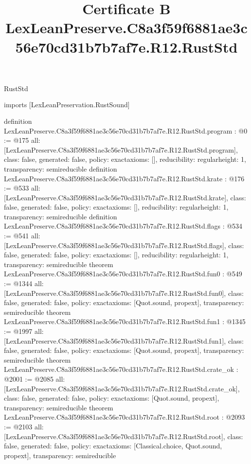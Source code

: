\begin{lexlean}{RustStd}
\title{Certificate B LexLeanPreserve.C8a3f59f6881ae3c56e70cd31b7b7af7e.R12.RustStd}
\begin{coremodule}
imports [LexLeanPreservation.RustSound]

definition LexLeanPreserve.C8a3f59f6881ae3c56e70cd31b7b7af7e.R12.RustStd.program : @0 := @175 {
  all: [LexLeanPreserve.C8a3f59f6881ae3c56e70cd31b7b7af7e.R12.RustStd.program],
  class: false,
  generated: false,
  policy: exact{axioms: []},
  reducibility: regular{height: 1},
  transparency: semireducible
}
definition LexLeanPreserve.C8a3f59f6881ae3c56e70cd31b7b7af7e.R12.RustStd.krate : @176 := @533 {
  all: [LexLeanPreserve.C8a3f59f6881ae3c56e70cd31b7b7af7e.R12.RustStd.krate],
  class: false,
  generated: false,
  policy: exact{axioms: []},
  reducibility: regular{height: 1},
  transparency: semireducible
}
definition LexLeanPreserve.C8a3f59f6881ae3c56e70cd31b7b7af7e.R12.RustStd.flags : @534 := @541 {
  all: [LexLeanPreserve.C8a3f59f6881ae3c56e70cd31b7b7af7e.R12.RustStd.flags],
  class: false,
  generated: false,
  policy: exact{axioms: []},
  reducibility: regular{height: 1},
  transparency: semireducible
}
theorem LexLeanPreserve.C8a3f59f6881ae3c56e70cd31b7b7af7e.R12.RustStd.fun0 : @549 := @1344 {
  all: [LexLeanPreserve.C8a3f59f6881ae3c56e70cd31b7b7af7e.R12.RustStd.fun0],
  class: false,
  generated: false,
  policy: exact{axioms: [Quot.sound, propext]},
  transparency: semireducible
}
theorem LexLeanPreserve.C8a3f59f6881ae3c56e70cd31b7b7af7e.R12.RustStd.fun1 : @1345 := @1997 {
  all: [LexLeanPreserve.C8a3f59f6881ae3c56e70cd31b7b7af7e.R12.RustStd.fun1],
  class: false,
  generated: false,
  policy: exact{axioms: [Quot.sound, propext]},
  transparency: semireducible
}
theorem LexLeanPreserve.C8a3f59f6881ae3c56e70cd31b7b7af7e.R12.RustStd.crate_ok : @2001 := @2085 {
  all: [LexLeanPreserve.C8a3f59f6881ae3c56e70cd31b7b7af7e.R12.RustStd.crate_ok],
  class: false,
  generated: false,
  policy: exact{axioms: [Quot.sound, propext]},
  transparency: semireducible
}
theorem LexLeanPreserve.C8a3f59f6881ae3c56e70cd31b7b7af7e.R12.RustStd.root : @2093 := @2103 {
  all: [LexLeanPreserve.C8a3f59f6881ae3c56e70cd31b7b7af7e.R12.RustStd.root],
  class: false,
  generated: false,
  policy: exact{axioms: [Classical.choice, Quot.sound, propext]},
  transparency: semireducible
}


\end{coremodule}
\end{lexlean}
